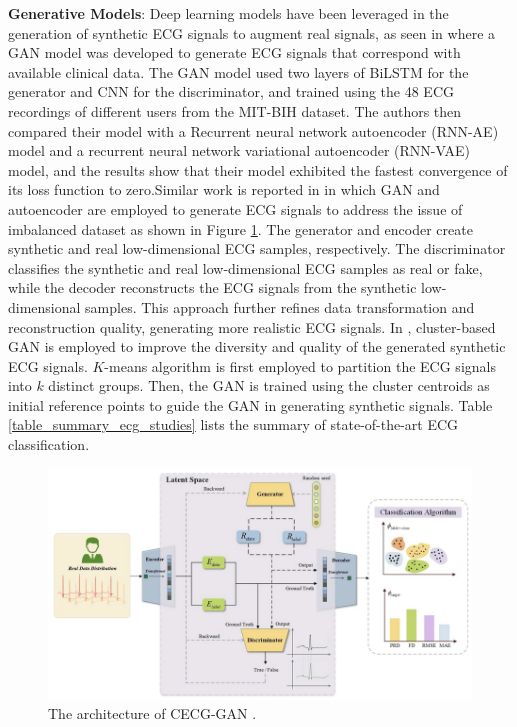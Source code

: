 \documentclass[preprint,12pt]{elsarticle}
\begin{document}
\textbf{Generative Models}: Deep learning models have been leveraged in the generation of synthetic ECG signals to augment real signals, as seen in \citep{zhu_electrocardiogram_2019} where a GAN model was developed to generate ECG signals that correspond with available clinical data. The GAN model used two layers of BiLSTM  for the generator and CNN for the discriminator, and trained using the 48 ECG recordings of different users from the MIT-BIH dataset. The authors then compared their model with a Recurrent neural network autoencoder (RNN-AE) model and a recurrent neural network variational autoencoder (RNN-VAE) model, and the results show that their model exhibited the fastest convergence of its loss function to zero.Similar work is reported in \citep{yang_data_2024} in which GAN and autoencoder are employed to generate ECG signals to address the issue of imbalanced dataset as shown in Figure \ref{fig_ecg_gan_ae}. The generator and encoder create synthetic and real low-dimensional ECG samples, respectively. The discriminator classifies the synthetic and real low-dimensional ECG samples as real or fake, while the decoder reconstructs the ECG signals from the synthetic low-dimensional samples. This approach further refines data transformation and reconstruction quality, generating more realistic ECG signals. In \citep{msigwa_iot-driven_2024}, cluster-based GAN is employed to improve the diversity and quality of the generated synthetic ECG signals. $K$-means algorithm is first employed to partition the ECG signals into $k$ distinct groups. Then, the GAN is trained using the cluster centroids as initial reference points to guide the GAN in generating synthetic signals. Table \ref{table_summary_ecg_studies} lists the summary of state-of-the-art ECG classification.

\begin{figure}[h!]
    \centering
    \includegraphics[scale=0.4]{fig_ecg_gan_ae.png}
    \caption{The architecture of CECG-GAN \citep{yang_data_2024}.}
    \label{fig_ecg_gan_ae}
\end{figure}
\end{document}
